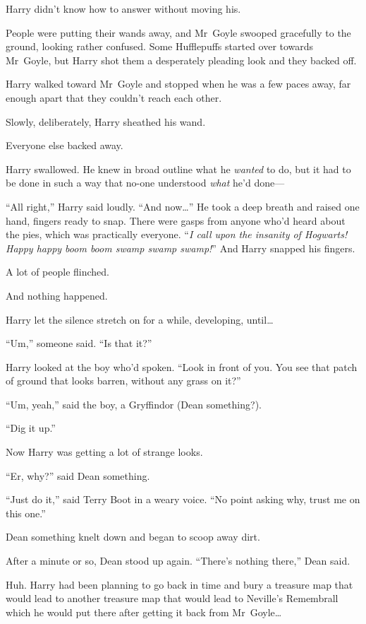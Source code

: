 Harry didn’t know how to answer without moving his.

People were putting their wands away, and Mr~Goyle swooped gracefully to the ground, looking rather confused. Some Hufflepuffs started over towards Mr~Goyle, but Harry shot them a desperately pleading look and they backed off.

Harry walked toward Mr~Goyle and stopped when he was a few paces away, far enough apart that they couldn’t reach each other.

Slowly, deliberately, Harry sheathed his wand.

Everyone else backed away.

Harry swallowed. He knew in broad outline what he \emph{wanted} to do, but it had to be done in such a way that no-one understood \emph{what} he’d done—

“All right,” Harry said loudly. “And now…” He took a deep breath and raised one hand, fingers ready to snap. There were gasps from anyone who’d heard about the pies, which was practically everyone. “\emph{I call upon the insanity of Hogwarts! Happy happy boom boom swamp swamp swamp!}” And Harry snapped his fingers.

A lot of people flinched.

And nothing happened.

Harry let the silence stretch on for a while, developing, until…

“Um,” someone said. “Is that it?”

Harry looked at the boy who’d spoken. “Look in front of you. You see that patch of ground that looks barren, without any grass on it?”

“Um, yeah,” said the boy, a Gryffindor (Dean something?).

“Dig it up.”

Now Harry was getting a lot of strange looks.

“Er, why?” said Dean something.

“Just do it,” said Terry Boot in a weary voice. “No point asking why, trust me on this one.”

Dean something knelt down and began to scoop away dirt.

After a minute or so, Dean stood up again. “There’s nothing there,” Dean said.

Huh. Harry had been planning to go back in time and bury a treasure map that would lead to another treasure map that would lead to Neville’s Remembrall which he would put there after getting it back from Mr~Goyle…

